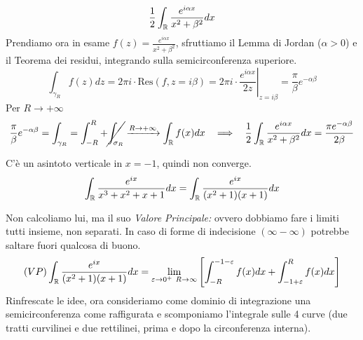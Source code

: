 \begin{equation*}
\frac{1}{2}\int _{\mathbb{R} }\frac{e^{i\alpha x}}{x^{2} +\beta ^{2}} dx
\end{equation*}Prendiamo ora in esame $f(z)=\frac{e^{i\alpha x}}{x^{2} +\beta ^{2}}$, sfruttiamo il Lemma di Jordan ($\alpha  >0$) e il Teorema dei residui, integrando sulla semicirconferenza superiore.
\begin{equation*}
\int _{\gamma _{R}} f( z) dz=2\pi i\cdotp \mathrm{Res}( f,z=i\beta ) =2\pi i\cdotp \left. \frac{e^{i\alpha x}}{2z}\right| _{z=i\beta } =\frac{\pi }{\beta } e^{-\alpha \beta }
\end{equation*}
Per $R\rightarrow +\infty $
\begin{equation*}
\frac{\pi }{\beta } e^{-\alpha \beta } =\int _{\gamma _{R}} =\int ^{R}_{-R} +\cancel{\int _{\sigma _{R}}}\xrightarrow{R\rightarrow +\infty }\int _{\RR } f( x) dx\ \ \implies \ \ \frac{1}{2}\int _{\RR }\frac{e^{i\alpha x}}{x^{2} +\beta ^{2}} dx=\frac{\pi e^{-\alpha \beta }}{2\beta }
\end{equation*}
\Soluzione

C'è un asintoto verticale in $x=-1$, quindi non converge.\begin{equation*}
\int _{\mathbb{R} }\frac{e^{ix}}{x^{3} +x^{2} +x+1} dx=\int _{\mathbb{R} }\frac{e^{ix}}{(x^{2} +1)(x+1)} dx
\end{equation*}

Non calcoliamo lui, ma il suo \textit{Valore Principale:} ovvero dobbiamo fare i limiti tutti insieme, non separati. In caso di forme di indecisione $( \infty -\infty )$ potrebbe saltare fuori qualcosa di buono.
\begin{equation*}
( VP)\int _{\mathbb{R} }\frac{e^{ix}}{(x^{2} +1)(x+1)} dx=\lim _{\varepsilon \rightarrow 0^{+} \ R\rightarrow \infty }\left[\int ^{-1-\varepsilon }_{-R} f(x)dx+\int ^{R}_{-1+\varepsilon } f(x)dx\right]
\end{equation*}
Rinfrescate le idee, ora consideriamo come dominio di integrazione una semicirconferenza come raffigurata e scomponiamo l'integrale sulle 4 curve (due tratti curvilinei e due rettilinei, prima e dopo la circonferenza interna).


